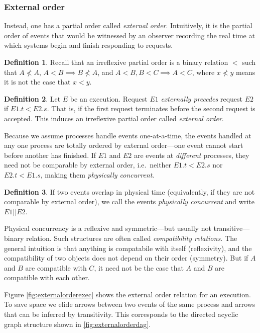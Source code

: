 \documentclass[]             %
{NASA}                       %
\theoremstyle{definition}
\newtheorem{definition}{Definition}[section]
\begin{document}
\subsubsection{External order}
\label{causal-precedencehappens-beforeexternal-order}
Instead, one has a partial order called \emph{external order}.
Intuitively, it is the partial order of events that would be witnessed
by an observer recording the real time at which systems begin and
finish responding to requests.

\begin{definition}
  Recall that an irreflexive partial order is a binary relation \(<\)
  such that \(A \not < A\), \(A < B \implies B \not < A\), and \(A <
  B, B < C \implies A < C\), where $x \not < y$ means it is not the
  case that $x < y$.
\end{definition}


\begin{definition}
  Let $E$ be an execution. Request $E1$ \emph{externally precedes}
  request $E2$ if $E1.t < E2.s$. That is, if the first request
  terminates before the second request is accepted. This induces an
  irreflexive partial order called \emph{external order}.
\end{definition}

Because we assume processes handle events one-at-a-time, the events
handled at any one process are totally ordered by external order---one
event cannot start before another has finished. If \(E1\) and \(E2\) are
events at \emph{different} processes, they need not be comparable by
external order, i.e.~neither \(E1.t < E2.s\) nor \(E2.t < E1.s\), making
them \emph{physically concurrent}.

\begin{definition}
  If two events overlap in physical time (equivalently, if they are
  not comparable by external order), we call the events
  \emph{physically concurrent} and write $E1 || E2$.
\end{definition}

Physical concurrency is a reflexive and symmetric---but usually not
transitive--- binary relation. Such structures are often called
\emph{compatibility relations.} The general intuition is that anything
is compatabile with itself (reflexivity), and the compatibility of two
objects does not depend on their order (symmetry). But if \(A\) and
\(B\) are compatible with \(C\), it need not be the case that \(A\)
and \(B\) are compatible with each other.

Figure \ref{fig:externalorderexec} shows the external order relation
for an execution. To save space we elide arrows between two events of
the same process and arrows that can be inferred by transitivity. This
corresponds to the directed acyclic graph structure shown in
\ref{fig:externalorderdag}.
\end{document}
